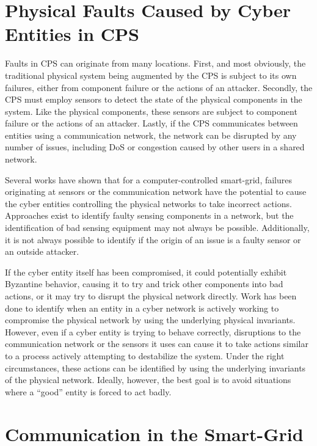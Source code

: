 \section{Physical Faults Caused by Cyber Entities in CPS}

Faults in \ac{CPS} can originate from many locations.
First, and most obviously, the traditional physical system being augmented by the CPS is subject to its own failures, either from component failure or the actions of an attacker.
Secondly, the \ac{CPS} must employ sensors to detect the state of the physical components in the system.
Like the physical components, these sensors are subject to component failure or the actions of an attacker.
Lastly, if the \ac{CPS} communicates between entities using a communication network, the network can be disrupted by any number of issues, including DoS or congestion caused by other users in a shared network.

Several works have shown\cite{Roth2012}\cite{HARINI}\cite{CYBERRESEARCHCALL} that for a computer-controlled smart-grid, failures originating at sensors or the communication network have the potential to cause the cyber entities controlling the physical networks to take incorrect actions.
Approaches exist to identify faulty sensing components in a network, but the identification of bad sensing equipment may not always be possible.
Additionally, it is not always possible to identify if the origin of an issue is a faulty sensor or an outside attacker.

If the cyber entity itself has been compromised, it could potentially exhibit Byzantine behavior, causing it to try and trick other components into bad actions\cite{Roth2012}, or it may try to disrupt the physical network directly.
Work has been done to identify when an entity in a cyber network is actively working to compromise the physical network by using the underlying physical invariants.
However, even if a cyber entity is trying to behave correctly, disruptions to the communication network or the sensors it uses can cause it to take actions similar to a process actively attempting to destabilize the system.
Under the right circumstances, these actions can be identified by using the underlying invariants of the physical network.
Ideally, however, the best goal is to avoid situations where a ``good'' entity is forced to act badly.

\section{Communication in the Smart-Grid}

